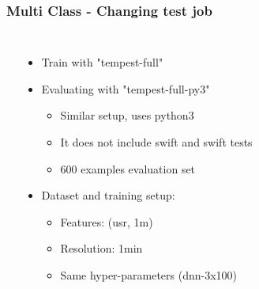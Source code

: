\documentclass[aspectratio=169,11pt,hyperref={colorlinks=true}]{beamer}
\begin{document}
\begin{frame}
    \frametitle{Multi Class - Changing test job}
    \begin{columns}
        \begin{table}[h!]
          \begin{center}
            \label{multi_eval_compare}
          \end{center}
       \end{table}
        \begin{itemize}
            \item{Train with "tempest-full"}
            \item{Evaluating with "tempest-full-py3"}
            \begin{itemize}
              \item{Similar setup, uses python3}
              \item{It does not include swift and swift tests}
              \item{600 examples evaluation set}
            \end{itemize}
            \item{Dataset and training setup:}
            \begin{itemize}
              \item{Features: (usr, 1m)}
              \item{Resolution: 1min}
              \item{Same hyper-parameters (dnn-3x100)}
            \end{itemize}
        \end{itemize}
    \end{columns}
\end{frame}
\end{document}
